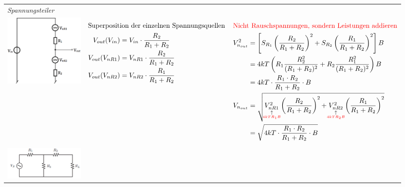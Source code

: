 \begin{longtable}[t]{|p{4cm}|p{5.2cm}|p{7cm}|}    
    \hline 
    \multicolumn{3}{|l|}{\textit{Spannungsteiler}}
    \\ \hdashline
    \includegraphics[width=4cm, valign=t]{pictures/RauschenSpannungsteiler.png}
    & {\begin{align*}
            \intertext{Superposition der einzelnen Spannungsquellen}
            V_{out}(V_{in}) &= V_{in} \cdot \frac{R_2}{R_1 + R_2}\\
            V_{out}(V_{nR1}) &= V_{nR1} \cdot \frac{R_2}{R_1 + R_2}\\
            V_{out}(V_{nR2}) &= V_{nR2} \cdot \frac{R_1}{R_1 + R_2}
        \end{align*}
      }
    & {\begin{align*}
            \intertext{\textcolor{red}{Nicht Rauschspannungen, sondern Leistungen addieren}}
            V_{n_{out}}^2 &= \left[ S_{R_1}\left( \frac{R_2}{R_1 + R_2}\right) ^2 + S_{R_2}\left( \frac{R_1}{R_1 + R_2}\right) ^2\right] B \\
            &= 4kT\left( R_1 \frac{R_2^2}{(R_1+R_2)^2} + R_2 \frac{R_1^2}{(R_1+R_2)^2}\right) B\\
            &= 4kT \cdot \frac{R_1 \cdot R_2}{R_1 + R_2}\cdot B\\
            V_{n_{out}} &= \sqrt{\mathrel{\mathop{V_{nR1}^2}\limits_{\substack{\uparrow\\\hbox to 0pt{\hss{\textcolor{red}{\tiny $4kT R_1 B$}}\hss}}}} \left( \frac{R_2}{R_1+R_2}\right) ^2 + \mathrel{\mathop{V_{nR2}^2}\limits_{\substack{\uparrow\\\hbox to 0pt{\hss{\textcolor{red}{\tiny $4kT R_2 B$}}\hss}}}} \left( \frac{R_1}{R_1+R_2}\right) ^2}\\
            &= \sqrt{4kT \cdot \frac{R_1 \cdot R_2}{R_1 + R_2}\cdot B}
        \end{align*}
      }
    \\ \hdashline
    \includegraphics[width=4cm, valign=t]{pictures/seriewiderstand1.png}\newline

\end{longtable}
